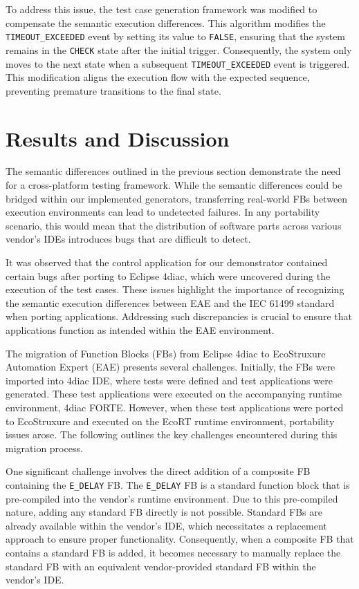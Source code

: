 To address this issue, the test case generation framework was modified to compensate the semantic execution differences. This algorithm modifies the \texttt{TIMEOUT\_EXCEEDED} event by setting its value to \texttt{FALSE}, ensuring that the system remains in the \texttt{CHECK} state after the initial trigger. Consequently, the system only moves to the next state when a subsequent \texttt{TIMEOUT\_EXCEEDED} event is triggered. This modification aligns the execution flow with the expected sequence, preventing premature transitions to the final state.



\section{Results and Discussion}
\label{sec::results}
The semantic differences outlined in the previous section demonstrate the need for a cross-platform testing framework. While the semantic differences could be bridged within our implemented generators, transferring real-world FBs between execution environments can lead to undetected failures. In any portability scenario, this would mean that the distribution of software parts across various vendor's IDEs introduces bugs that are difficult to detect.

It was observed that the control application for our demonstrator contained certain bugs after porting to Eclipse 4diac, which were uncovered during the execution of the test cases. These issues highlight the importance of recognizing the semantic execution differences between EAE and the IEC 61499 standard when porting applications. Addressing such discrepancies is crucial to ensure that applications function as intended within the EAE environment.

The migration of Function Blocks (FBs) from Eclipse 4diac to EcoStruxure Automation Expert (EAE) presents several challenges. Initially, the FBs were imported into 4diac IDE, where tests were defined and test applications were generated. 
These test applications were executed on the accompanying runtime environment, 4diac FORTE. However, when these test applications were ported to EcoStruxure and executed on the EcoRT runtime environment, portability issues arose. The following outlines the key challenges encountered during this migration process.

One significant challenge involves the direct addition of a composite FB containing the \texttt{E\_DELAY} FB. The \texttt{E\_DELAY} FB is a standard function block that is pre-compiled into the vendor's runtime environment. Due to this pre-compiled nature, adding any standard FB directly is not possible. Standard FBs are already available within the vendor's IDE, which necessitates a replacement approach to ensure proper functionality. Consequently, when a composite FB that contains a standard FB is added, it becomes necessary to manually replace the standard FB with an equivalent vendor-provided standard FB within the vendor's IDE. %

